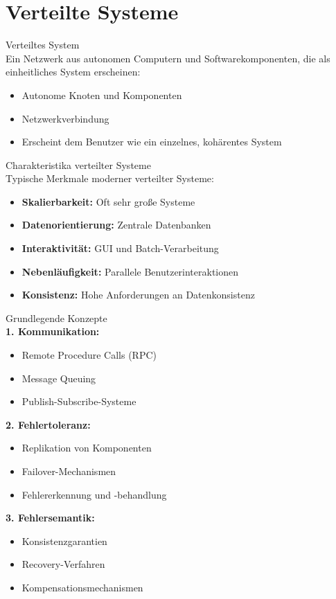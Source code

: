 \section{Verteilte Systeme}

\begin{definition}{Verteiltes System}\\
Ein Netzwerk aus autonomen Computern und Softwarekomponenten, die als einheitliches System erscheinen:
\begin{itemize}
    \item Autonome Knoten und Komponenten
    \item Netzwerkverbindung
    \item Erscheint dem Benutzer wie ein einzelnes, kohärentes System
\end{itemize}
\end{definition}

\begin{concept}{Charakteristika verteilter Systeme}\\
Typische Merkmale moderner verteilter Systeme:
\begin{itemize}
    \item \textbf{Skalierbarkeit:} Oft sehr große Systeme
    \item \textbf{Datenorientierung:} Zentrale Datenbanken
    \item \textbf{Interaktivität:} GUI und Batch-Verarbeitung
    \item \textbf{Nebenläufigkeit:} Parallele Benutzerinteraktionen
    \item \textbf{Konsistenz:} Hohe Anforderungen an Datenkonsistenz
\end{itemize}
\end{concept}

\begin{theorem}{Grundlegende Konzepte}\\
\textbf{1. Kommunikation:}
\begin{itemize}
    \item Remote Procedure Calls (RPC)
    \item Message Queuing
    \item Publish-Subscribe-Systeme
\end{itemize}

\textbf{2. Fehlertoleranz:}
\begin{itemize}
    \item Replikation von Komponenten
    \item Failover-Mechanismen
    \item Fehlererkennung und -behandlung
\end{itemize}

\textbf{3. Fehlersemantik:}
\begin{itemize}
    \item Konsistenzgarantien
    \item Recovery-Verfahren
    \item Kompensationsmechanismen
\end{itemize}
\end{theorem}


